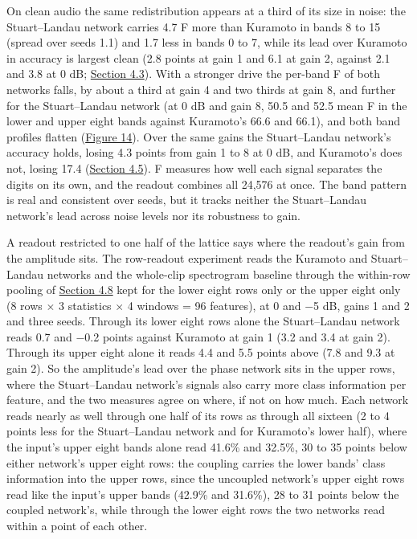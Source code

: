 \documentclass{article}
\begin{document}
On clean audio the same redistribution appears at a third of its size in
noise: the Stuart--Landau network carries 4.7 F more than Kuramoto in
bands 8 to 15 (spread over seeds 1.1) and 1.7 less in bands 0 to 7,
while its lead over Kuramoto in accuracy is largest clean (2.8 points at
gain 1 and 6.1 at gain 2, against 2.1 and 3.8 at 0 dB;
\hyperref[sec-4-3]{Section 4.3}). With a stronger drive the per-band F
of both networks falls, by about a third at gain 4 and two thirds at
gain 8, and further for the Stuart--Landau network (at 0 dB and gain 8,
50.5 and 52.5 mean F in the lower and upper eight bands against
Kuramoto's 66.6 and 66.1), and both band profiles flatten
(\hyperref[fig-fig15-appD2-class-information-gain]{Figure 14}). Over the
same gains the Stuart--Landau network's accuracy holds, losing 4.3
points from gain 1 to 8 at 0 dB, and Kuramoto's does not, losing 17.4
(\hyperref[sec-4-5]{Section 4.5}). F measures how well each signal
separates the digits on its own, and the readout combines all 24,576 at
once. The band pattern is real and consistent over seeds, but it tracks
neither the Stuart--Landau network's lead across noise levels nor its
robustness to gain.

A readout restricted to one half of the lattice says where the readout's
gain from the amplitude sits. The row-readout experiment reads the
Kuramoto and Stuart--Landau networks and the whole-clip spectrogram
baseline through the within-row pooling of \hyperref[sec-4-8]{Section
4.8} kept for the lower eight rows only or the upper eight only (8 rows
\ensuremath{\times} 3 statistics \ensuremath{\times} 4 windows = 96
features), at 0 and \ensuremath{-}5 dB, gains 1 and 2 and three seeds.
Through its lower eight rows alone the Stuart--Landau network reads 0.7
and \ensuremath{-}0.2 points against Kuramoto at gain 1 (3.2 and 3.4 at
gain 2). Through its upper eight alone it reads 4.4 and 5.5 points above
(7.8 and 9.3 at gain 2). So the amplitude's lead over the phase network
sits in the upper rows, where the Stuart--Landau network's signals also
carry more class information per feature, and the two measures agree on
where, if not on how much. Each network reads nearly as well through one
half of its rows as through all sixteen (2 to 4 points less for the
Stuart--Landau network and for Kuramoto's lower half), where the input's
upper eight bands alone read 41.6\% and 32.5\%, 30 to 35 points below
either network's upper eight rows: the coupling carries the lower bands'
class information into the upper rows, since the uncoupled network's
upper eight rows read like the input's upper bands (42.9\% and 31.6\%),
28 to 31 points below the coupled network's, while through the lower
eight rows the two networks read within a point of each other.
\end{document}
